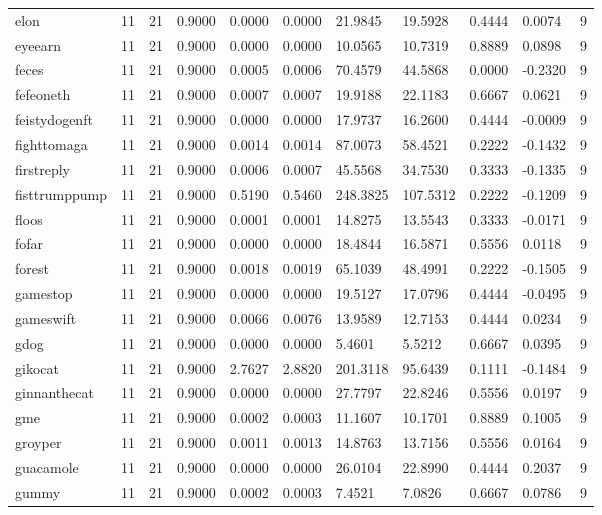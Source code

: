 \begin{table}[htbp]
\begin{tabular}{lllllllllll}
elon & 11 & 21 & 0.9000 & 0.0000 & 0.0000 & 21.9845 & 19.5928 & 0.4444 & 0.0074 & 9 \\
eyeearn & 11 & 21 & 0.9000 & 0.0000 & 0.0000 & 10.0565 & 10.7319 & 0.8889 & 0.0898 & 9 \\
feces & 11 & 21 & 0.9000 & 0.0005 & 0.0006 & 70.4579 & 44.5868 & 0.0000 & -0.2320 & 9 \\
fefeoneth & 11 & 21 & 0.9000 & 0.0007 & 0.0007 & 19.9188 & 22.1183 & 0.6667 & 0.0621 & 9 \\
feistydogenft & 11 & 21 & 0.9000 & 0.0000 & 0.0000 & 17.9737 & 16.2600 & 0.4444 & -0.0009 & 9 \\
fighttomaga & 11 & 21 & 0.9000 & 0.0014 & 0.0014 & 87.0073 & 58.4521 & 0.2222 & -0.1432 & 9 \\
firstreply & 11 & 21 & 0.9000 & 0.0006 & 0.0007 & 45.5568 & 34.7530 & 0.3333 & -0.1335 & 9 \\
fisttrumppump & 11 & 21 & 0.9000 & 0.5190 & 0.5460 & 248.3825 & 107.5312 & 0.2222 & -0.1209 & 9 \\
floos & 11 & 21 & 0.9000 & 0.0001 & 0.0001 & 14.8275 & 13.5543 & 0.3333 & -0.0171 & 9 \\
fofar & 11 & 21 & 0.9000 & 0.0000 & 0.0000 & 18.4844 & 16.5871 & 0.5556 & 0.0118 & 9 \\
forest & 11 & 21 & 0.9000 & 0.0018 & 0.0019 & 65.1039 & 48.4991 & 0.2222 & -0.1505 & 9 \\
gamestop & 11 & 21 & 0.9000 & 0.0000 & 0.0000 & 19.5127 & 17.0796 & 0.4444 & -0.0495 & 9 \\
gameswift & 11 & 21 & 0.9000 & 0.0066 & 0.0076 & 13.9589 & 12.7153 & 0.4444 & 0.0234 & 9 \\
gdog & 11 & 21 & 0.9000 & 0.0000 & 0.0000 & 5.4601 & 5.5212 & 0.6667 & 0.0395 & 9 \\
gikocat & 11 & 21 & 0.9000 & 2.7627 & 2.8820 & 201.3118 & 95.6439 & 0.1111 & -0.1484 & 9 \\
ginnanthecat & 11 & 21 & 0.9000 & 0.0000 & 0.0000 & 27.7797 & 22.8246 & 0.5556 & 0.0197 & 9 \\
gme & 11 & 21 & 0.9000 & 0.0002 & 0.0003 & 11.1607 & 10.1701 & 0.8889 & 0.1005 & 9 \\
groyper & 11 & 21 & 0.9000 & 0.0011 & 0.0013 & 14.8763 & 13.7156 & 0.5556 & 0.0164 & 9 \\
guacamole & 11 & 21 & 0.9000 & 0.0000 & 0.0000 & 26.0104 & 22.8990 & 0.4444 & 0.2037 & 9 \\
gummy & 11 & 21 & 0.9000 & 0.0002 & 0.0003 & 7.4521 & 7.0826 & 0.6667 & 0.0786 & 9 \\

\end{tabular}
\end{table}
